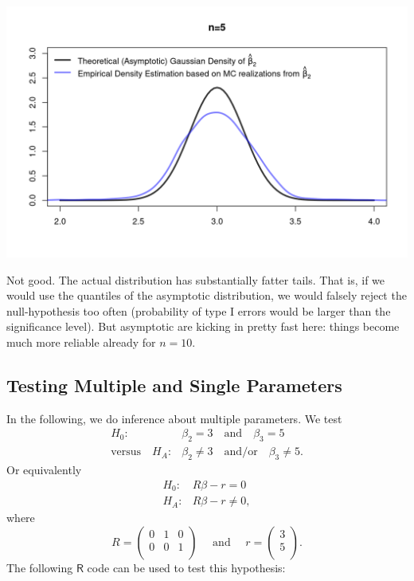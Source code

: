 \documentclass[
  14pt,
]{memoir}
\begin{document}
\begin{center}\includegraphics[width=1\textwidth]{figure/minimal-unnamed-chunk-83-1} \end{center}

Not good. The actual distribution has substantially fatter tails. That is, if we would use the quantiles of the asymptotic distribution, we would falsely reject the null-hypothesis too often (probability of type I errors would be larger than the significance level). But asymptotic are kicking in pretty fast here: things become much more reliable already for \(n=10\).

\hypertarget{testing-multiple-and-single-parameters}{%
\subsection{Testing Multiple and Single Parameters}\label{testing-multiple-and-single-parameters}}

In the following, we do inference about multiple parameters. We test
\begin{align*}
H_0:&\beta_2=3\quad\text{and}\quad\beta_3=5\\
\text{versus}\quad H_A:&\beta_2\neq 3\quad\text{and/or}\quad\beta_3\neq 5.
\end{align*}
Or equivalently
\begin{align*}
H_0:&R\beta -r = 0 \\
H_A:&R\beta -r \neq 0,
\end{align*}
where
\[
R=\left(
\begin{matrix}
0&1&0\\
0&0&1\\
\end{matrix}\right)\quad\text{ and }\quad 
r=\left(\begin{matrix}3\\5\\\end{matrix}\right).
\]
The following \(\textsf{R}\) code can be used to test this hypothesis:
\end{document}
